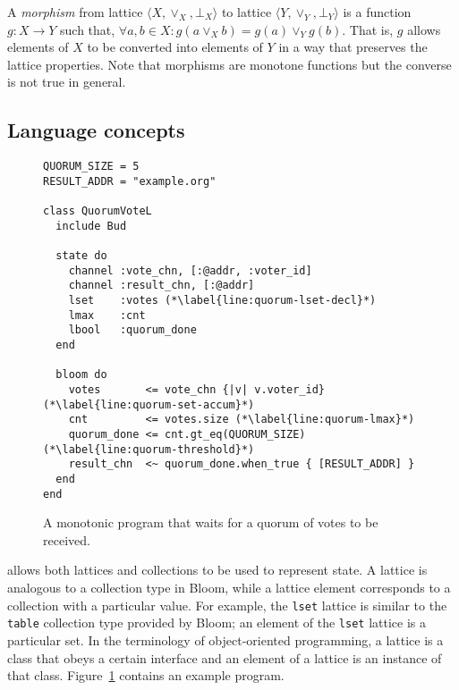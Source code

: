 A \emph{morphism} from lattice $\langle X, \lor_X, \bot_X\rangle$ to lattice
$\langle Y, \lor_Y, \bot_Y\rangle$ is a function $g: X \to Y$ such that,
$\forall a,b \in X: g(a \lor_X b) = g(a) \lor_Y g(b)$. That is, $g$ allows
elements of $X$ to be converted into elements of $Y$ in a way that preserves the
lattice properties.  Note that morphisms are monotone functions but the converse
is not true in general.

\subsection{Language concepts}
\begin{figure}[t]
\begin{scriptsize}
\begin{lstlisting}
QUORUM_SIZE = 5
RESULT_ADDR = "example.org"

class QuorumVoteL
  include Bud

  state do
    channel :vote_chn, [:@addr, :voter_id]
    channel :result_chn, [:@addr]
    lset    :votes (*\label{line:quorum-lset-decl}*)
    lmax    :cnt
    lbool   :quorum_done
  end

  bloom do
    votes       <= vote_chn {|v| v.voter_id} (*\label{line:quorum-set-accum}*)
    cnt         <= votes.size (*\label{line:quorum-lmax}*)
    quorum_done <= cnt.gt_eq(QUORUM_SIZE) (*\label{line:quorum-threshold}*)
    result_chn  <~ quorum_done.when_true { [RESULT_ADDR] }
  end
end
\end{lstlisting}
\end{scriptsize}
\caption{A monotonic \lang program that waits for a quorum of votes to be received.}
\label{fig:lattice-quorum}
\end{figure}

\lang allows both lattices and collections to be used to represent state. A
lattice is analogous to a collection type in Bloom, while a lattice element
corresponds to a collection with a particular value. For example, the
\texttt{lset} lattice is similar to the \texttt{table} collection type provided
by Bloom; an element of the \texttt{lset} lattice is a particular set. In the
terminology of object-oriented programming, a lattice is a class that obeys a
certain interface and an element of a lattice is an instance of that
class. Figure~\ref{fig:lattice-quorum} contains an example \lang program.

